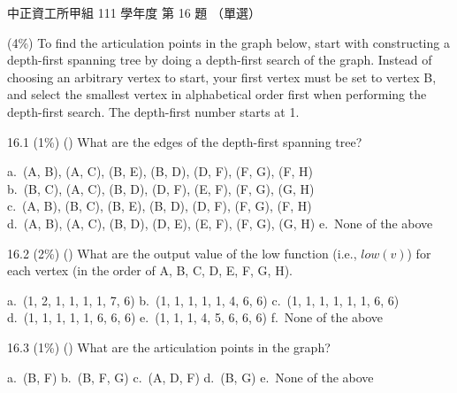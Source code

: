 \begin{pastexam}[label={px:ccu-111-swa-08}]{中正資工所甲組 111 學年度 第 16 題}
（單選）

(4\%) To find the articulation points in the graph below, start with constructing a depth-first
spanning tree by doing a depth-first search of the graph. Instead of choosing an arbitrary vertex
to start, your first vertex must be set to vertex B, and select the smallest vertex in alphabetical
order first when performing the depth-first search. The depth-first number starts at 1.
\begin{center}
\end{center}

16.1 (1\%) (\quad) What are the edges of the depth-first spanning tree?

\quad a.~(A, B), (A, C), (B, E), (B, D), (D, F), (F, G), (F, H)\\
\quad b.~(B, C), (A, C), (B, D), (D, F), (E, F), (F, G), (G, H)\\
\quad c.~(A, B), (B, C), (B, E), (B, D), (D, F), (F, G), (F, H)\\
\quad d.~(A, B), (A, C), (B, D), (D, E), (E, F), (F, G), (G, H) \qquad e.~None of the above

16.2 (2\%) (\quad) What are the output value of the low function (i.e., $\mathit{low}(v)$) for each
vertex (in the order of A, B, C, D, E, F, G, H).

\quad a.~(1, 2, 1, 1, 1, 1, 7, 6) \qquad b.~(1, 1, 1, 1, 1, 4, 6, 6) \qquad c.~(1, 1, 1, 1, 1, 1, 6, 6)\\
\quad d.~(1, 1, 1, 1, 1, 6, 6, 6) \qquad e.~(1, 1, 1, 4, 5, 6, 6, 6) \qquad f.~None of the above

16.3 (1\%) (\quad) What are the articulation points in the graph?

\quad a.~(B, F) \qquad b.~(B, F, G) \qquad c.~(A, D, F) \qquad d.~(B, G) \qquad e.~None of the above
\end{pastexam}

